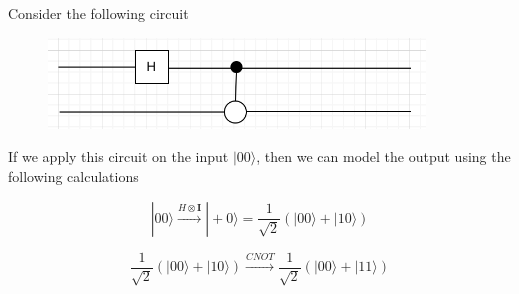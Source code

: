 \documentclass{article}
\begin{document}
Consider the following circuit

\begin{figure}[htp]
	\centering
	\includegraphics[width=10cm]{extwoqubit.png}
\end{figure}

If we apply this circuit on the input $|00\rangle$, then we can model the output using the following calculations

$$|00\rangle \xrightarrow[]{H \otimes \mathbf{I}} |+0\rangle = \frac{1}{\sqrt{2}}(|00\rangle + |10\rangle)$$

$$\frac{1}{\sqrt{2}}(|00\rangle + |10\rangle) \xrightarrow[]{CNOT} \frac{1}{\sqrt{2}}(|00\rangle + |11\rangle)$$

\end{document}
